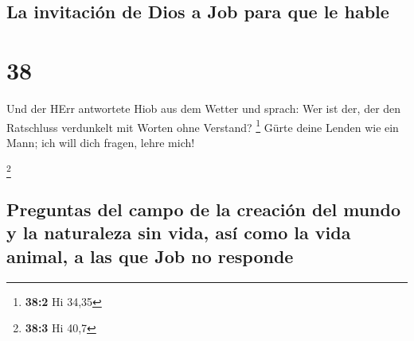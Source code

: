 \hypertarget{la-invitaciuxf3n-de-dios-a-job-para-que-le-hable}{%
\subsection{La invitación de Dios a Job para que le
hable}\label{la-invitaciuxf3n-de-dios-a-job-para-que-le-hable}}

\hypertarget{section-37}{%
\section{38}\label{section-37}}

 Und der HErr antwortete Hiob aus dem Wetter und sprach:
 Wer ist der, der den Ratschluss verdunkelt mit Worten
ohne Verstand? \footnote{\textbf{38:2} Hi 34,35}  Gürte
deine Lenden wie ein Mann; ich will dich fragen, lehre mich!

\footnote{\textbf{38:3} Hi 40,7}

\hypertarget{preguntas-del-campo-de-la-creaciuxf3n-del-mundo-y-la-naturaleza-sin-vida-asuxed-como-la-vida-animal-a-las-que-job-no-responde}{%
\subsection{Preguntas del campo de la creación del mundo y la naturaleza
sin vida, así como la vida animal, a las que Job no
responde}\label{preguntas-del-campo-de-la-creaciuxf3n-del-mundo-y-la-naturaleza-sin-vida-asuxed-como-la-vida-animal-a-las-que-job-no-responde}}


